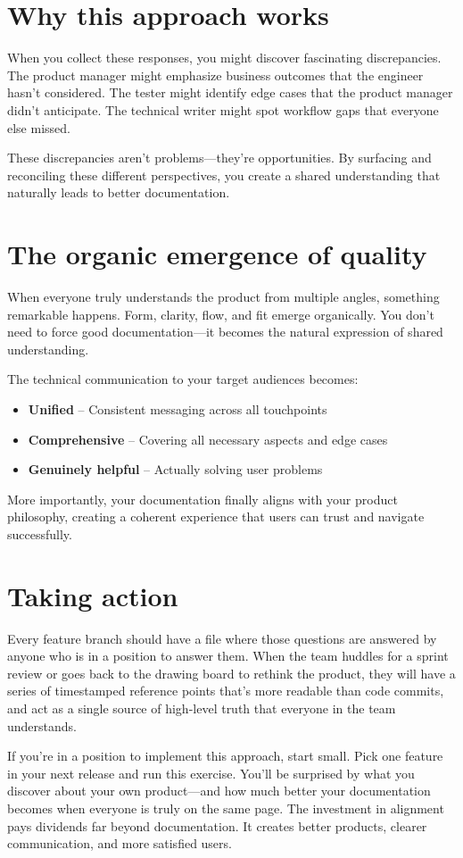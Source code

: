\documentclass{article}
\begin{document}
\section*{Why this approach works}

When you collect these responses, you might discover fascinating discrepancies. The product manager might emphasize business outcomes that the engineer hasn't considered. The tester might identify edge cases that the product manager didn't anticipate. The technical writer might spot workflow gaps that everyone else missed.

These discrepancies aren't problems---they're opportunities. By surfacing and reconciling these different perspectives, you create a shared understanding that naturally leads to better documentation.

\section*{The organic emergence of quality}

When everyone truly understands the product from multiple angles, something remarkable happens. Form, clarity, flow, and fit emerge organically. You don't need to force good documentation---it becomes the natural expression of shared understanding.

The technical communication to your target audiences becomes:

\begin{itemize}
    \item \textbf{Unified} -- Consistent messaging across all touchpoints
    \item \textbf{Comprehensive} -- Covering all necessary aspects and edge cases
    \item \textbf{Genuinely helpful} -- Actually solving user problems
\end{itemize}

More importantly, your documentation finally aligns with your product philosophy, creating a coherent experience that users can trust and navigate successfully.

\section*{Taking action}

Every feature branch should have a file where those questions are answered by anyone who is in a position to answer them. When the team huddles for a sprint review or goes back to the drawing board to rethink the product, they will have a series of timestamped reference points that's more readable than code commits, and act as a single source of high-level truth that everyone in the team understands.

If you're in a position to implement this approach, start small. Pick one feature in your next release and run this exercise. You'll be surprised by what you discover about your own product---and how much better your documentation becomes when everyone is truly on the same page. The investment in alignment pays dividends far beyond documentation. It creates better products, clearer communication, and more satisfied users.
\end{document}
